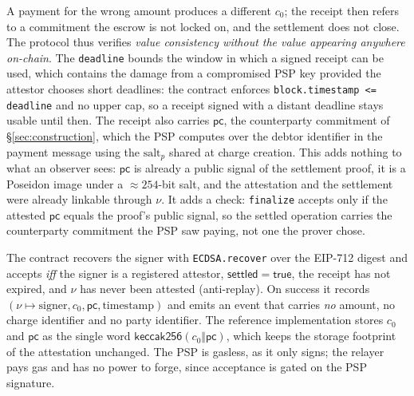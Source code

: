 \documentclass[11pt]{article}
\newcommand{\code}[1]{\texttt{#1}}
\begin{document}
A payment for the wrong amount produces a different $c_0$; the receipt then
refers to a commitment the escrow is not locked on, and the settlement does not
close. The protocol thus verifies \emph{value consistency without the value
appearing anywhere on-chain}. The \code{deadline} bounds the window in which a
signed receipt can be used, which contains the damage from a compromised PSP key
provided the attestor chooses short deadlines: the contract enforces
\code{block.timestamp <= deadline} and no upper cap, so a receipt signed with a
distant deadline stays usable until then. The receipt also carries
$\mathsf{pc}$, the counterparty commitment of \S\ref{sec:construction}, which the
PSP computes over the debtor identifier in the payment message using the
$\text{salt}_p$ shared at charge creation. This adds nothing to what an observer
sees: $\mathsf{pc}$ is already a public signal of the settlement proof, it is a
Poseidon image under a $\approx 254$-bit salt, and the attestation and the
settlement were already linkable through $\nu$. It adds a check:
\code{finalize} accepts only if the attested $\mathsf{pc}$ equals the proof's
public signal, so the settled operation carries the counterparty commitment the
PSP saw paying, not one the prover chose.

The contract recovers the signer with \code{ECDSA.recover} over the EIP-712
digest and accepts \emph{iff} the signer is a registered attestor,
$\mathsf{settled} =\textsf{true}$, the receipt has not expired, and $\nu$ has
never been attested (anti-replay). On success it records $(\nu \mapsto
\text{signer}, c_0, \mathsf{pc}, \text{timestamp})$ and emits an event that
carries \emph{no} amount, no charge identifier and no party identifier. The
reference implementation stores $c_0$ and $\mathsf{pc}$ as the single word
$\mathsf{keccak256}(c_0 \Vert \mathsf{pc})$, which keeps the storage footprint of
the attestation unchanged. The PSP is gasless, as it only signs; the relayer
pays gas and has no power to forge, since acceptance is gated on the PSP
signature.
\end{document}
